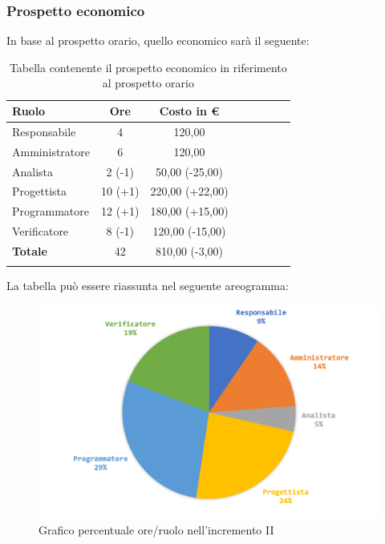 		\subsubsection{Prospetto economico}
			In base al prospetto orario, quello economico sarà il seguente: 
			
			\begin{longtable}{|l|c|c|c|c|c|c|c|}
				\hline
				\rowcolor{lighter-grayer}
				\textbf{Ruolo} & \textbf{Ore} & \textbf{Costo in €} \\
				\hline
				\endfirsthead
				\hline
			Responsabile 	    & 4 & 120,00\\
			\hline 
			\hline
			Amministratore	  & 6 & 120,00\\
			\hline
			\hline
			Analista 				& 2 (-1) & 50,00 (-25,00) \\
			\hline
			\hline
			Progettista 		  & 10 (+1) & 220,00 (+22,00)\\
			\hline
			\hline
			Programmatore 	 & 12 (+1) & 180,00 (+15,00)\\
			\hline
			\hline
			Verificatore 		  & 8 (-1) & 120,00 (-15,00) \\
			\hline
			\textbf{Totale} 	& 42 & 810,00 (-3,00) \\
			\hline
				
				\caption{Tabella contenente il prospetto economico in riferimento al prospetto orario}
			\end{longtable}
		\pagebreak
			
			La tabella può essere riassunta nel seguente areogramma:
			\begin{figure}[H]
				\centering
				\includegraphics[width=0.8\linewidth]{images/consuntivo/ConsIncr2-2.png}
				\caption{Grafico percentuale ore/ruolo nell'incremento II}
				\label{fig:consuntivo grafico costi ruolo incremento II}
			\end{figure}

